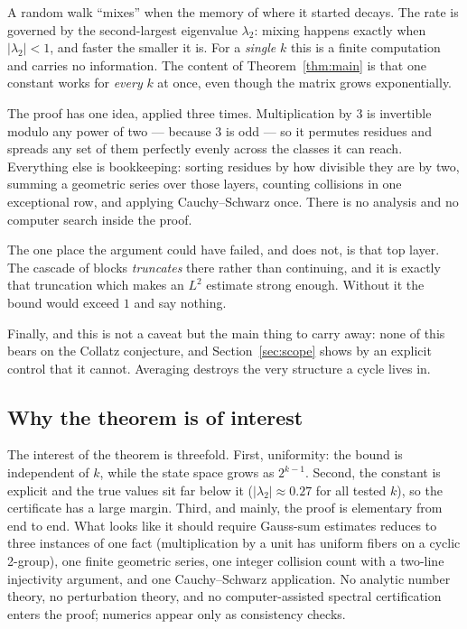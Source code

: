\documentclass[12pt,a4paper]{article}
\begin{document}
A random walk ``mixes'' when the memory of where it started decays. The rate is governed by the
second-largest eigenvalue $\lambda_2$: mixing happens exactly when $|\lambda_2| < 1$, and faster
the smaller it is. For a \emph{single} $k$ this is a finite computation and carries no
information. The content of Theorem~\ref{thm:main} is that one constant works for
\emph{every} $k$ at once, even though the matrix grows exponentially.

The proof has one idea, applied three times. Multiplication by $3$ is invertible modulo any power
of two --- because $3$ is odd --- so it permutes residues and spreads any set of them perfectly
evenly across the classes it can reach. Everything else is bookkeeping: sorting residues by how
divisible they are by two, summing a geometric series over those layers, counting collisions in
one exceptional row, and applying Cauchy--Schwarz once. There is no analysis and no computer
search inside the proof.

The one place the argument could have failed, and does not, is that top layer. The cascade of
blocks \emph{truncates} there rather than continuing, and it is exactly that truncation which
makes an $L^2$ estimate strong enough. Without it the bound would exceed $1$ and say nothing.

Finally, and this is not a caveat but the main thing to carry away: none of this bears on the
Collatz conjecture, and Section~\ref{sec:scope} shows by an explicit control that it cannot.
Averaging destroys the very structure a cycle lives in.

\subsection*{Why the theorem is of interest}

The interest of the theorem is threefold. First, uniformity: the bound is independent of $k$,
while the state space grows as $2^{k-1}$. Second, the constant is explicit and the true values
sit far below it ($|\lambda_2| \approx 0.27$ for all tested $k$), so the certificate has a large
margin. Third, and mainly, the proof is elementary from end to end. What looks like it should
require Gauss-sum estimates reduces to three instances of one fact (multiplication by a unit has
uniform fibers on a cyclic 2-group), one finite geometric series, one integer collision count
with a two-line injectivity argument, and one Cauchy--Schwarz application. No analytic number
theory, no perturbation theory, and no computer-assisted spectral certification enters the proof;
numerics appear only as consistency checks.
\end{document}
